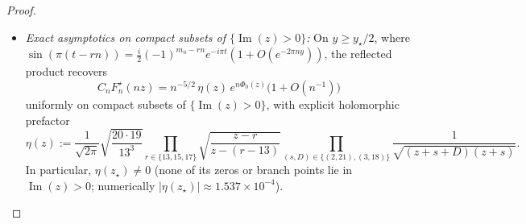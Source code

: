 \documentclass[11pt,reqno]{amsart}
\theoremstyle{definition}
\theoremstyle{remark}
\begin{document}
\begin{proof}
\begin{itemize}
  \[
    \left|\frac{\pi^2}{\sin^2(\pi t)}\,C_n F_n^{\star}\bigl(n(c_n + iy)\bigr)\right|
    \ll n^{-5/2}(1 + y)^{-2} e^{n\psi(y)},
  \]
  and the identical bound for the $R_{4,n}$ integrand.
  \item \emph{Exact asymptotics on compact subsets of $\{\operatorname{Im}(z) > 0\}$:} On $y \ge y_\star/2$, where $\sin(\pi(t - rn)) = \frac{i}{2}(-1)^{m_n - rn} e^{-i\pi t}(1 + O(e^{-2\pi ny}))$, the reflected product recovers
  \[
    C_n F_n^{\star}(nz) = n^{-5/2}\,\eta(z)\, e^{n\Phi_0(z)}\bigl(1 + O(n^{-1})\bigr)
  \]
  uniformly on compact subsets of $\{\operatorname{Im}(z) > 0\}$, with explicit holomorphic prefactor
  \[
    \eta(z) := \frac{1}{\sqrt{2\pi}}\sqrt{\frac{20\cdot 19}{13^3}}
      \prod_{r \in \{13, 15, 17\}} \sqrt{\frac{z - r}{z - (r - 13)}}
      \prod_{(s, D) \in \{(2,21),(3,18)\}} \frac{1}{\sqrt{(z + s + D)(z + s)}}.
  \]
  In particular, $\eta(z_\star) \ne 0$ (none of its zeros or branch points lie in $\operatorname{Im}(z) > 0$; numerically $|\eta(z_\star)| \approx 1.537 \times 10^{-4}$).
\end{itemize}


\end{proof}
\end{document}

